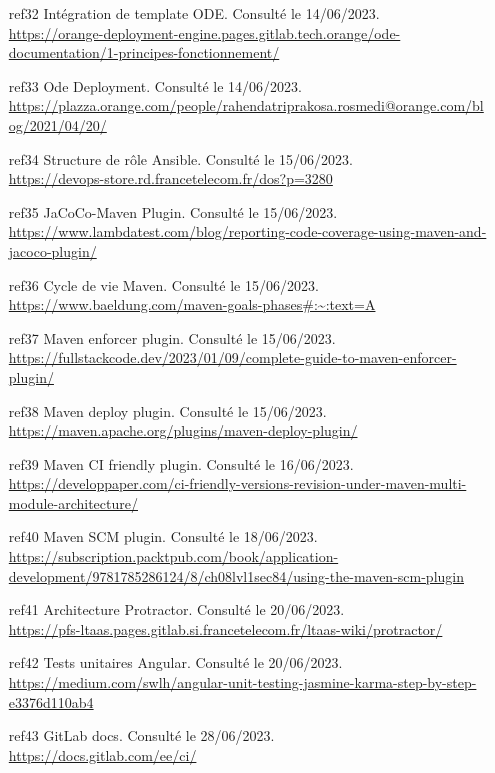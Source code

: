 \begin{enumerate}
\item[ref32] Intégration de template ODE. Consulté le 14/06/2023.\\
\url{https://orange-deployment-engine.pages.gitlab.tech.orange/ode-documentation/1-principes-fonctionnement/}
\item[ref33] Ode Deployment. Consulté le 14/06/2023.\\
\url{https://plazza.orange.com/people/rahendatriprakosa.rosmedi@orange.com/blog/2021/04/20/}

\item[ref34] Structure de rôle Ansible. Consulté le 15/06/2023.\\
\url{https://devops-store.rd.francetelecom.fr/dos?p=3280}

\item[ref35] JaCoCo-Maven Plugin. Consulté le 15/06/2023.\\
\url{https://www.lambdatest.com/blog/reporting-code-coverage-using-maven-and-jacoco-plugin/}

\item[ref36] Cycle de vie Maven. Consulté le 15/06/2023.\\
\url{https://www.baeldung.com/maven-goals-phases#:~:text=A}

\item[ref37] Maven enforcer plugin. Consulté le 15/06/2023.\\
\url{https://fullstackcode.dev/2023/01/09/complete-guide-to-maven-enforcer-plugin/}

\item[ref38] Maven deploy plugin. Consulté le 15/06/2023.\\
\url{https://maven.apache.org/plugins/maven-deploy-plugin/}

\item[ref39] Maven CI friendly plugin. Consulté le 16/06/2023.\\
\url{https://developpaper.com/ci-friendly-versions-revision-under-maven-multi-module-architecture/}

\item[ref40] Maven SCM plugin. Consulté le 18/06/2023.\\
\url{https://subscription.packtpub.com/book/application-development/9781785286124/8/ch08lvl1sec84/using-the-maven-scm-plugin}

\item[ref41] Architecture Protractor. Consulté le 20/06/2023.\\
\url{https://pfs-ltaas.pages.gitlab.si.francetelecom.fr/ltaas-wiki/protractor/}

\item[ref42] Tests unitaires Angular. Consulté le 20/06/2023.\\
\url{https://medium.com/swlh/angular-unit-testing-jasmine-karma-step-by-step-e3376d110ab4}

\item[ref43] GitLab docs. Consulté le 28/06/2023.\\
\url{https://docs.gitlab.com/ee/ci/}
\end{enumerate}

